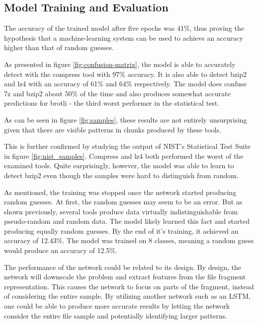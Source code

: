 \documentclass[conference]{IEEEtran}
\begin{document}
\subsection{Model Training and Evaluation}

The accuracy of the trained model after five epochs was 41\%, thus proving the hypothesis that a machine-learning system can be used to achieve an accuracy higher than that of random guesses.

As presented in figure \ref{fig:confusion-matrix}, the model is able to accurately detect with the compress tool with 97\% accuracy. It is also able to detect bzip2 and lz4 with an accuracy of 61\% and 64\% respectively. The model does confuse 7z and bzip2 about 50\% of the time and also produces somewhat accurate predictions for brotli - the third worst performer in the statistical test.

As can be seen in figure \ref{fig:samples}, these results are not entirely unsurprising given that there are visible patterns in chunks produced by these tools.

This is further confirmed by studying the output of NIST's Statistical Test Suite in figure \ref{fig:nist_samples}. Compress and lz4 both performed the worst of the examined tools. Quite surprisingly, however, the model was able to learn to detect bzip2 even though the samples were hard to distinguish from random.


As mentioned, the training was stopped once the network started producing random guesses. At first, the random guesses may seem to be an error. But as shown previously, several tools produce data virtually indistinguishable from pseudo-random and random data. The model likely learned this fact and started producing equally random guesses. By the end of it's training, it achieved an accuracy of 12.43\%. The model was trained on 8 classes, meaning a random guess would produce an accuracy of 12.5\%.

The performance of the network could be related to its design. By design, the network will downscale the problem and extract features from the file fragment representation\cite{chen2018}. This causes the network to focus on parts of the fragment, instead of considering the entire sample. By utilizing another network such as an LSTM, one could be able to produce more accurate results by letting the network consider the entire file sample and potentially identifying larger patterns\cite{LE2018S118}.
\end{document}
